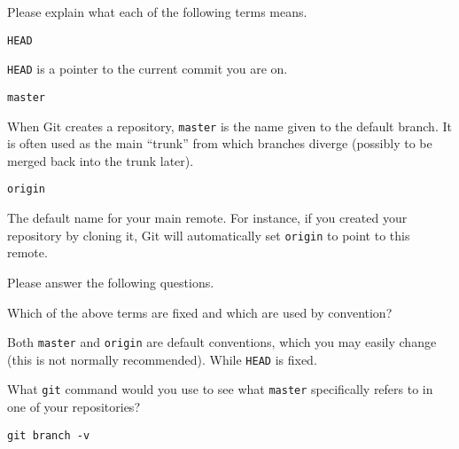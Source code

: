 \documentclass[10pt]{examdesign}
\begin{document}
\begin{shortanswer}[title={Short Answer (2 pts each)},
                    rearrange=no,resetcounter=no]

\begin{block}[questions=3]
Please explain what each of the following terms means.

\begin{question}
  \texttt{HEAD}
  \vspace{5mm}
  \begin{answer}
    \texttt{HEAD} is a pointer to the current commit you are on.
  \end{answer}
\end{question}

\begin{question}
  \texttt{master}
  \vspace{5mm}
  \begin{answer}
    When Git creates a repository, \texttt{master} is the name given
    to the default branch.  It is often used as the main ``trunk'' from
    which branches diverge (possibly to be merged back into the
    trunk later).
  \end{answer}
\end{question}

\begin{question}
  \texttt{origin}
  \vspace{5mm}
  \begin{answer}
    The default name for your main remote.  For instance, if you created
    your repository by cloning it, Git will automatically set \texttt{origin}
    to point to this remote.
  \end{answer}
\end{question}
\end{block}

\begin{block}[questions=3]
Please answer the following questions.

\begin{question}
  Which of the above terms are fixed and which are used by convention?
  \vspace{5mm}
  \begin{answer}
    Both \texttt{master} and \texttt{origin} are default conventions, which
    you may easily change (this is not normally recommended).  While
    \texttt{HEAD} is fixed.
  \end{answer}
\end{question}

\begin{question}
  What \texttt{git} command would you use to see what \texttt{master}
  specifically refers to in one of your repositories?
  \vspace{5mm}
  \begin{answer}
    \texttt{git branch -v}
  \end{answer}
\end{question}


\end{block}
\end{shortanswer}
\end{document}
